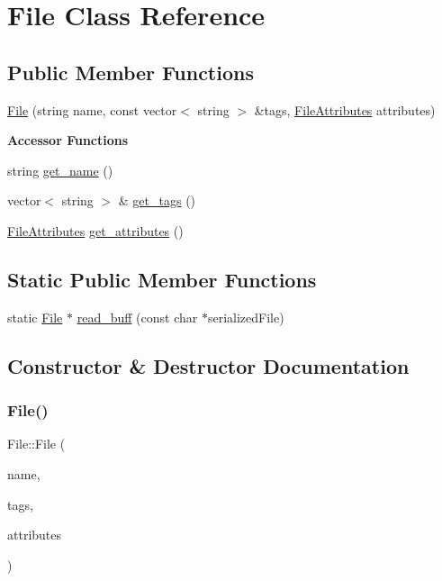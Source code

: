 \hypertarget{classFile}{}\section{File Class Reference}
\label{classFile}
\subsection*{Public Member Functions}
\begin{DoxyCompactItemize}
\item 
\mbox{\hyperlink{classFile_af29e498f601951f4ccf06f2fc3fb1f73}{File}} (string name, const vector$<$ string $>$ \&tags, \mbox{\hyperlink{structfile__attributes}{File\+Attributes}} attributes)
\end{DoxyCompactItemize}
\begin{Indent}\textbf{ Accessor Functions}\par
\begin{DoxyCompactItemize}
\item 
string \mbox{\hyperlink{classFile_a4b8e86f4fae0219744cf82f6bab35b53}{get\+\_\+name}} ()
\item 
vector$<$ string $>$ \& \mbox{\hyperlink{classFile_a479270bfe1fa436d317151ac108eb28a}{get\+\_\+tags}} ()
\item 
\mbox{\hyperlink{structfile__attributes}{File\+Attributes}} \mbox{\hyperlink{classFile_a9f59d3d546e8e574889558d63c71bf02}{get\+\_\+attributes}} ()
\end{DoxyCompactItemize}
\end{Indent}
\subsection*{Static Public Member Functions}
\begin{DoxyCompactItemize}
\item 
static \mbox{\hyperlink{classFile}{File}} $\ast$ \mbox{\hyperlink{classFile_a1118d477e6b00d789e948e8cca5ae393}{read\+\_\+buff}} (const char $\ast$serialized\+File)
\end{DoxyCompactItemize}


\subsection{Constructor \& Destructor Documentation}
\mbox{\label{classFile_af29e498f601951f4ccf06f2fc3fb1f73}} 
\subsubsection{\texorpdfstring{File()}{File()}}
{\footnotesize\ttfamily File\+::\+File (\begin{DoxyParamCaption}\item[{string}]{name,  }\item[{const vector$<$ string $>$ \&}]{tags,  }\item[{\mbox{\hyperlink{structfile__attributes}{File\+Attributes}}}]{attributes }\end{DoxyParamCaption})}


